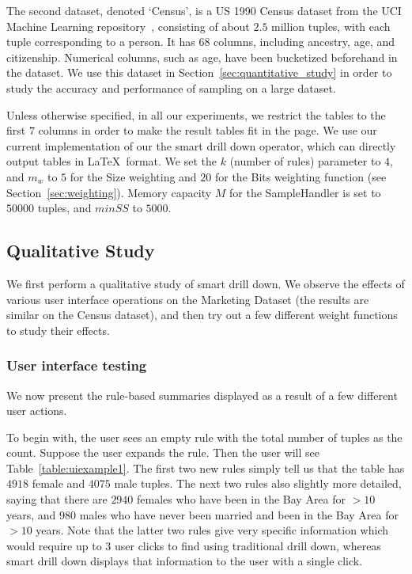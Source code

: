 The second dataset, denoted `Census', is a US 1990 Census dataset from the UCI Machine Learning repository~\cite{uciml},
consisting of about $2.5$ million tuples, with each tuple corresponding to a person. It has $68$ columns, including ancestry, age, and citizenship. Numerical columns, such as age, have been bucketized beforehand in the dataset. We use this dataset in Section~\ref{sec:quantitative_study} in order to study the accuracy and performance of sampling on a large dataset.

Unless otherwise specified, in all our experiments, we restrict the tables to the first $7$ columns in order to make the result tables fit in the page. We use our current implementation of our the smart drill down operator, which can directly output tables in \LaTeX \ format. We set the $k$ (number of rules) parameter to $4$, and $m_w$ to $5$ for the Size weighting and $20$ for the Bits weighting function (see Section~\ref{sec:weighting}). Memory capacity $M$ for the SampleHandler is set to $50000$ tuples, and $minSS$ to $5000$.

\subsection{Qualitative Study}
We first perform a qualitative study of smart drill down. We observe the effects of various user interface operations on the Marketing Dataset (the results are similar on the Census dataset), and then try out a few different weight functions to study their effects.
\subsubsection{User interface testing}
We now present the rule-based summaries displayed as a result of a few different user actions.

To begin with, the user sees an empty rule with the total number of tuples as the count. Suppose the user expands the rule. Then the user will see Table~\ref{table:uiexample1}. The first two new rules simply tell us that the table has $4918$ female and $4075$ male tuples. The next two rules also slightly more detailed, saying that there are $2940$ females who have been in the Bay Area for $> 10$ years, and $980$ males who have never been married and been in the Bay Area for $> 10$ years. Note that the latter two rules give very specific information which would require up to $3$ user clicks to find using traditional drill down, whereas smart drill down displays that information to the user with a single click. 

